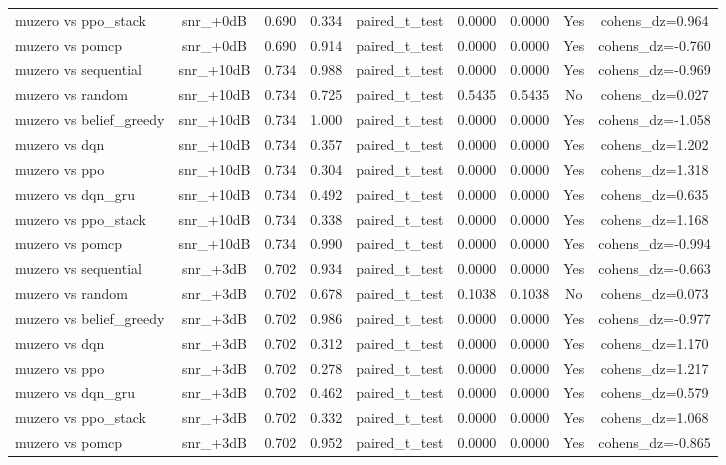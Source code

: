 \begin{table}[htbp]
\begin{tabular}{lcccccccc}
muzero vs ppo_stack & snr_+0dB & 0.690 & 0.334 & paired_t_test & 0.0000 & 0.0000 & Yes & cohens_dz=0.964 \\
muzero vs pomcp & snr_+0dB & 0.690 & 0.914 & paired_t_test & 0.0000 & 0.0000 & Yes & cohens_dz=-0.760 \\
muzero vs sequential & snr_+10dB & 0.734 & 0.988 & paired_t_test & 0.0000 & 0.0000 & Yes & cohens_dz=-0.969 \\
muzero vs random & snr_+10dB & 0.734 & 0.725 & paired_t_test & 0.5435 & 0.5435 & No & cohens_dz=0.027 \\
muzero vs belief_greedy & snr_+10dB & 0.734 & 1.000 & paired_t_test & 0.0000 & 0.0000 & Yes & cohens_dz=-1.058 \\
muzero vs dqn & snr_+10dB & 0.734 & 0.357 & paired_t_test & 0.0000 & 0.0000 & Yes & cohens_dz=1.202 \\
muzero vs ppo & snr_+10dB & 0.734 & 0.304 & paired_t_test & 0.0000 & 0.0000 & Yes & cohens_dz=1.318 \\
muzero vs dqn_gru & snr_+10dB & 0.734 & 0.492 & paired_t_test & 0.0000 & 0.0000 & Yes & cohens_dz=0.635 \\
muzero vs ppo_stack & snr_+10dB & 0.734 & 0.338 & paired_t_test & 0.0000 & 0.0000 & Yes & cohens_dz=1.168 \\
muzero vs pomcp & snr_+10dB & 0.734 & 0.990 & paired_t_test & 0.0000 & 0.0000 & Yes & cohens_dz=-0.994 \\
muzero vs sequential & snr_+3dB & 0.702 & 0.934 & paired_t_test & 0.0000 & 0.0000 & Yes & cohens_dz=-0.663 \\
muzero vs random & snr_+3dB & 0.702 & 0.678 & paired_t_test & 0.1038 & 0.1038 & No & cohens_dz=0.073 \\
muzero vs belief_greedy & snr_+3dB & 0.702 & 0.986 & paired_t_test & 0.0000 & 0.0000 & Yes & cohens_dz=-0.977 \\
muzero vs dqn & snr_+3dB & 0.702 & 0.312 & paired_t_test & 0.0000 & 0.0000 & Yes & cohens_dz=1.170 \\
muzero vs ppo & snr_+3dB & 0.702 & 0.278 & paired_t_test & 0.0000 & 0.0000 & Yes & cohens_dz=1.217 \\
muzero vs dqn_gru & snr_+3dB & 0.702 & 0.462 & paired_t_test & 0.0000 & 0.0000 & Yes & cohens_dz=0.579 \\
muzero vs ppo_stack & snr_+3dB & 0.702 & 0.332 & paired_t_test & 0.0000 & 0.0000 & Yes & cohens_dz=1.068 \\
muzero vs pomcp & snr_+3dB & 0.702 & 0.952 & paired_t_test & 0.0000 & 0.0000 & Yes & cohens_dz=-0.865 \\

\end{tabular}
\end{table}
